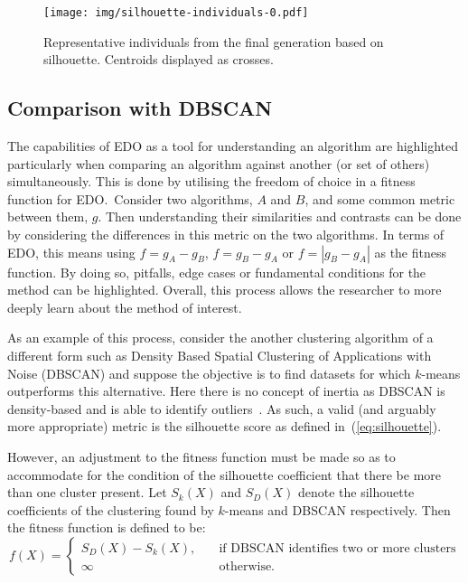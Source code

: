 \begin{figure}[htbp]
    \centering
    \texttt{[image: img/silhouette-individuals-0.pdf]}
    \caption{Representative individuals from the final generation based on
             silhouette. Centroids displayed as
             crosses.}\label{figure:silhouette-individuals}
\end{figure}


\subsection{Comparison with DBSCAN}

The capabilities of EDO as a tool for understanding an algorithm are highlighted
particularly when comparing an algorithm against another (or set of others)
simultaneously.  This is done by utilising the freedom of choice in a fitness
function for EDO.\ Consider two algorithms, \(A\) and \(B\), and some common
metric between them, \(g\). Then understanding their similarities and contrasts
can be done by considering the differences in this metric on the two algorithms.
In terms of EDO, this means using \(f = g_A - g_B\), \(f = g_B - g_A\) or \(f
= \left| g_B - g_A \right|\) as the fitness function. By doing so, pitfalls,
edge cases or fundamental conditions for the method can be highlighted.
Overall, this process allows the researcher to more deeply learn about the
method of interest.

As an example of this process, consider the another clustering algorithm of a
different form such as Density Based Spatial Clustering of Applications with
Noise (DBSCAN) and suppose the objective is to find datasets for which
\(k\)-means outperforms this alternative. Here there is no concept of inertia as
DBSCAN is density-based and is able to identify outliers~\cite{Ester1996}. As
such, a valid (and arguably more appropriate) metric is the silhouette score as
defined in~(\ref{eq:silhouette}).

However, an adjustment to the fitness function must be made so as to accommodate
for the condition of the silhouette coefficient that there be more than one
cluster present. Let \(S_k (X)\) and \(S_D (X)\) denote the silhouette
coefficients of the clustering found by \(k\)-means and DBSCAN respectively.
Then the fitness function is defined to be:
\[
    f(X) = 
        \begin{cases}
            S_D (X) - S_k (X), &\quad \text{if DBSCAN identifies two or more
            clusters}\\
            \infty &\quad \text{otherwise.}
        \end{cases}
\]

